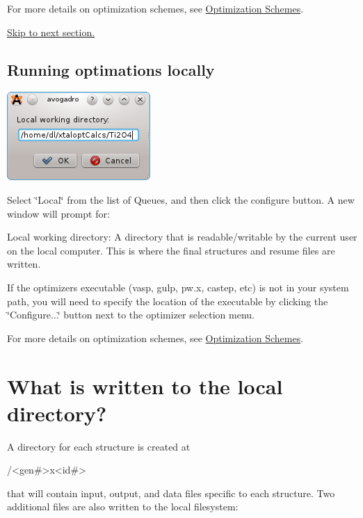 For more details on optimization schemes, see \hyperlink{optschemes}{Optimization Schemes}.

\hyperlink{tut-xo_files}{Skip to next section.}\hypertarget{tut-xo_localqi}{}\subsection{Running optimations locally}\label{tut-xo_localqi}
 
\begin{DoxyImageNoCaption}
  \mbox{\includegraphics[width=.5\textwidth]{opt-set-local.png}}
\end{DoxyImageNoCaption}


Select \char`\"{}\+Local\char`\"{} from the list of Queues, and then click the configure button. A new window will prompt for\+:
\begin{DoxyItemize}
\item Local working directory\+: A directory that is readable/writable by the current user on the local computer. This is where the final structures and resume files are written.
\end{DoxyItemize}

If the optimizer\textquotesingle{}s executable (vasp, gulp, pw.\+x, castep, etc) is not in your system path, you will need to specify the location of the executable by clicking the \char`\"{}\+Configure...\char`\"{} button next to the optimizer selection menu.

For more details on optimization schemes, see \hyperlink{optschemes}{Optimization Schemes}.\hypertarget{tut-xo_files}{}\section{What is written to the local directory?}\label{tut-xo_files}
A directory for each structure is created at


\begin{DoxyCode}
/<gen#>x<id#>
\end{DoxyCode}


that will contain input, output, and data files specific to each structure. Two additional files are also written to the local filesystem\+:


